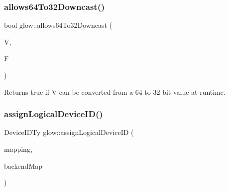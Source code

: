 \subsubsection{\texorpdfstring{allows64\+To32\+Downcast()}{allows64To32Downcast()}\hspace{0.1cm}{\footnotesize\ttfamily [2/2]}}
{\footnotesize\ttfamily bool glow\+::allows64\+To32\+Downcast (\begin{DoxyParamCaption}\item[{const \hyperlink{classglow_1_1_storage}{Storage} $\ast$}]{V,  }\item[{const \hyperlink{classglow_1_1_function}{Function} $\ast$}]{F }\end{DoxyParamCaption})}

\begin{DoxyReturn}{Returns}
true if {\ttfamily V} can be converted from a 64 to 32 bit value at runtime. 
\end{DoxyReturn}
\mbox{\label{namespaceglow_adce5a7edd1093d119dbed94a5dce5cdf}} 
\subsubsection{\texorpdfstring{assign\+Logical\+Device\+I\+D()}{assignLogicalDeviceID()}}
{\footnotesize\ttfamily Device\+I\+D\+Ty glow\+::assign\+Logical\+Device\+ID (\begin{DoxyParamCaption}\item[{\hyperlink{classglow_1_1_node_to_function_map}{Node\+To\+Function\+Map} \&}]{mapping,  }\item[{const std\+::map$<$ std\+::string, \hyperlink{structglow_1_1_backend_info}{Backend\+Info} $>$ \&}]{backend\+Map }\end{DoxyParamCaption})}

